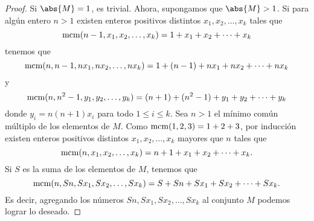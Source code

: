 \begin{proof}
	Si $\abs{M}=1$, es trivial. Ahora, supongamos que $\abs{M}>1$. Si para algún entero $n>1$ existen enteros positivos distintos $x_1,x_2,\dots,x_k$ tales que
	\[\operatorname{mcm}(n-1,x_1,x_2,\dots,x_k)=1+x_1+x_2+\dots+x_k\]
	tenemos que
	\[\operatorname{mcm}(n,n-1,nx_1,nx_2,\dots,nx_k)=1+(n-1)+nx_1+nx_2+\dots+nx_k\]
	y
	\[\operatorname{mcm}(n,n^2-1,y_1,y_2,\dots,y_k)=(n+1)+(n^2-1)+y_1+y_2+\dots+y_k\]
	donde $y_i=n(n+1)x_i$ para todo $1\le i\le k$. Sea $n>1$ el mínimo común múltiplo de los elementos de $M$. Como $\operatorname{mcm}(1,2,3)=1+2+3$, por inducción existen enteros positivos distintos $x_1,x_2,\dots,x_k$ mayores que $n$ tales que
	\[\operatorname{mcm}(n,x_1,x_2,\dots,x_k)=n+1+x_1+x_2+\dots+x_k.\]
	Si $S$ es la suma de los elementos de $M$, tenemos que
	\[\operatorname{mcm}(n,Sn,Sx_1,Sx_2,\dots,Sx_k)=S+Sn+Sx_1+Sx_2+\dots+Sx_k.\]
	Es decir, agregando los números $Sn,Sx_1,Sx_2,\dots,Sx_k$ al conjunto $M$ podemos lograr lo deseado.
\end{proof}
